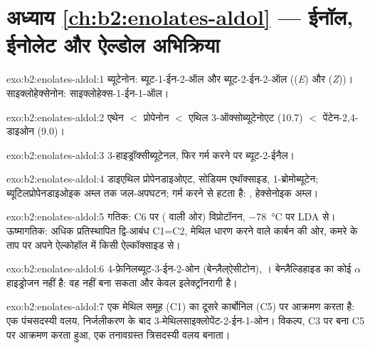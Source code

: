 \section*{अध्याय \ref{ch:b2:enolates-aldol} --- ईनॉल, ईनोलेट और ऐल्डोल अभिक्रिया}

\begin{solution}{exo:b2:enolates-aldol:1}
ब्यूटेनोन: ब्यूट-1-ईन-2-ऑल  और ब्यूट-2-ईन-2-ऑल  ((\textit{E}) और
(\textit{Z}))। साइक्लोहेक्सेनोन: साइक्लोहेक्स-1-ईन-1-ऑल।
\end{solution}

\begin{solution}{exo:b2:enolates-aldol:2}
एथेन $<$ प्रोपेनोन $<$ एथिल 3-ऑक्सोब्यूटेनोएट (10.7) $<$ पेंटेन-2,4-डाइओन (9.0)।
\end{solution}

\begin{solution}{exo:b2:enolates-aldol:3}
3-हाइड्रॉक्सीब्यूटेनल, फिर गर्म करने पर ब्यूट-2-ईनैल।
\end{solution}

\begin{solution}{exo:b2:enolates-aldol:4}
डाइएथिल प्रोपेनडाइओएट, सोडियम एथॉक्साइड, 1-ब्रोमोब्यूटेन; ब्यूटिलप्रोपेनडाइओइक अम्ल तक जल-अपघटन;
गर्म करने से  हटता है: , हेक्सेनोइक अम्ल।
\end{solution}

\begin{solution}{exo:b2:enolates-aldol:5}
गतिक: C6 पर ( वाली ओर) विप्रोटॉनन, \qty{-78}{\degreeCelsius} पर LDA से। ऊष्मागतिक:
अधिक प्रतिस्थापित द्वि-आबंध C1=C2, मेथिल धारण करने वाले कार्बन की ओर, कमरे के ताप पर अपने ऐल्कोहॉल में
किसी ऐल्कॉक्साइड से।
\end{solution}

\begin{solution}{exo:b2:enolates-aldol:6}
4-फ़ेनिलब्यूट-3-ईन-2-ओन (बेन्ज़ैल्ऐसीटोन), । बेन्ज़ैल्डिहाइड का कोई $\alpha$ हाइड्रोजन नहीं है: वह
 नहीं बना सकता और केवल इलेक्ट्रॉनरागी है।
\end{solution}

\begin{solution}{exo:b2:enolates-aldol:7}
एक मेथिल समूह (C1) का  दूसरे कार्बोनिल (C5) पर आक्रमण करता है: एक पंचसदस्यी वलय,
निर्जलीकरण के बाद 3-मेथिलसाइक्लोपेंट-2-ईन-1-ओन। विकल्प, C3 पर बना  C5 पर आक्रमण करता हुआ,
एक तनावग्रस्त त्रिसदस्यी वलय बनाता।
\end{solution}

